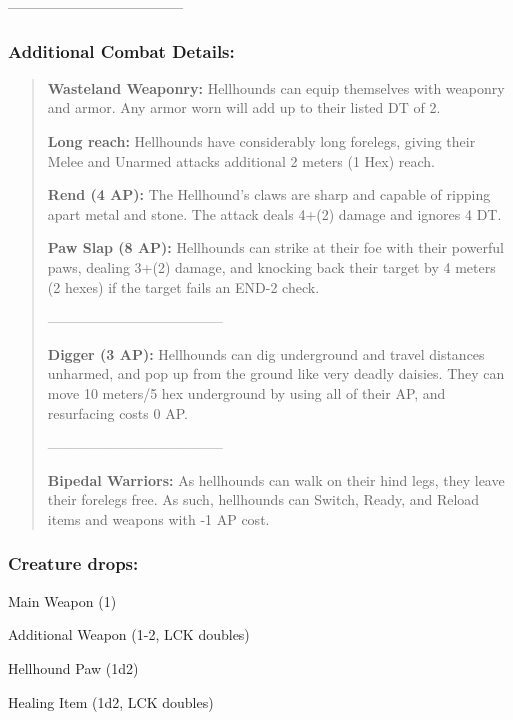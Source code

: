 \documentclass[11pt,a4paper,twocolumn]{book}
\begin{document}
	--------------------------------------
	
	\subsubsection*{Additional Combat Details:}
	\begin{verse}
		\textbf{Wasteland Weaponry:} Hellhounds can equip themselves with weaponry and armor. Any armor worn will add up to their listed DT of 2.
		
		\textbf{Long reach:} Hellhounds have considerably long forelegs, giving their Melee and Unarmed attacks additional 2 meters (1 Hex) reach.
		
		\textbf{Rend (4 AP):} The Hellhound's claws are sharp and capable of ripping apart metal and stone. The attack deals 4+(2) damage and ignores 4 DT.
		
		\textbf{Paw Slap (8 AP):} Hellhounds can strike at their foe with their powerful paws, dealing 3+(2) damage, and knocking back their target by 4 meters (2 hexes) if the target fails an END-2 check.		
		
		--------------------------------------				
		
		\textbf{Digger (3 AP):} Hellhounds can dig underground and travel distances unharmed, and pop up from the ground like very deadly daisies. They can move 10 meters/5 hex underground by using all of their AP, and resurfacing costs 0 AP.
		
		--------------------------------------
		
		\textbf{Bipedal Warriors:} As hellhounds can walk on their hind legs, they leave their forelegs free. As such, hellhounds can Switch, Ready, and Reload items and weapons with -1 AP cost.
		
	\end{verse}
	
	\subsubsection*{Creature drops:}
	\begin{compactitem}
		\item Main Weapon (1)
		\item Additional Weapon (1-2, LCK doubles)
		\item Hellhound Paw (1d2)
		\item Healing Item (1d2, LCK doubles)
	\end{compactitem}
	
\end{document}
